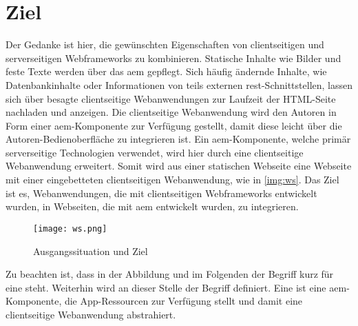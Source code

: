 \section{Ziel}
Der Gedanke ist hier, die gewünschten Eigenschaften von clientseitigen und serverseitigen Webframeworks zu kombinieren. Statische Inhalte wie Bilder und feste Texte werden über das \ac{aem} gepflegt. Sich häufig ändernde Inhalte, wie Datenbankinhalte oder Informationen von teils externen \ac{rest}-Schnittstellen, lassen sich über besagte clientseitige Webanwendungen zur Laufzeit der HTML-Seite nachladen und anzeigen. Die clientseitige Webanwendung wird den Autoren in Form einer \ac{aem}-Komponente zur Verfügung gestellt, damit diese leicht über die Autoren-Bedienoberfläche zu integrieren ist. Ein \ac{aem}-Komponente, welche primär serverseitige Technologien verwendet, wird hier durch eine clientseitige Webanwendung erweitert. Somit wird aus einer statischen Webseite eine Webseite mit einer eingebetteten clientseitigen Webanwendung, wie in \autoref{img:ws}. Das Ziel ist es, Webanwendungen, die mit clientseitigen Webframeworks entwickelt wurden, in Webseiten, die mit \ac{aem} entwickelt wurden, zu integrieren.\\

\begin{figure}[H]
	\begin{center}
		\texttt{[image: ws.png]}
		\caption{Ausgangssituation und Ziel}
		\label{img:ws}
	\end{center}
\end{figure}

Zu beachten ist, dass in der Abbildung und im Folgenden der Begriff  kurz für eine  steht. 
Weiterhin wird an dieser Stelle der Begriff \ajc{} definiert. Eine \ajc ist eine \ac{aem}-Komponente, die App-Ressourcen zur Verfügung stellt und damit eine clientseitige Webanwendung abstrahiert.



%
